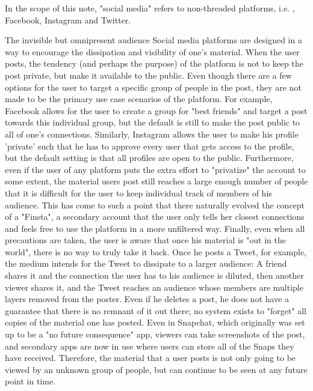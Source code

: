 In the scope of this note, "social media" refers to non-threaded platforms, i.e. , Facebook, Instagram and Twitter.
 
The invisible but omnipresent audience
Social media platforms are designed in a way to encourage the dissipation and visibility of one's material. When the user posts, the tendency (and perhaps the purpose) of the platform is not to keep the post private, but make it available to the public. Even though there are a few options for the user to target a specific group of people in the post, they are not made to be the primary use case scenarios of the platform. For example, Facebook allows for the user to create a group for "best friends" and target a post towards this individual group, but the default is still to make the post public to all of one's connections. Similarly, Instagram allows the user to make his profile 'private' such that he has to approve every user that gets access to the profile, but the default setting is that all profiles are open to the public. Furthermore, even if the user of any platform puts the extra effort to "privatize" the account to some extent, the material users post still reaches a large enough number of people that it is difficult for the user to keep individual track of members of his audience. This has come to such a point that there naturally evolved the concept of a "Finsta", a secondary account that the user only tells her closest connections and feels free to use the platform in a more unfiltered way. Finally, even when all precautions are taken, the user is aware that once his material is "out in the world", there is no way to truly take it back. Once he posts a Tweet, for example, the medium intends for the Tweet to dissipate to a larger audience: A friend shares it and the connection the user has to his audience is diluted, then another viewer shares it, and the Tweet reaches an audience whose members are multiple layers removed from the poster. Even if he deletes a post, he does not have a guarantee that there is no remnant of it out there; no system exists to "forget" all copies of the material one has posted. Even in Snapchat, which originally was set up to be a "no future consequence" app, viewers can take screenshots of the post, and secondary apps are now in use where users can store all of the Snaps they have received. Therefore, the material that a user posts is not only going to be viewed by an unknown group of people, but can continue to be seen at any future point in time. 
 
